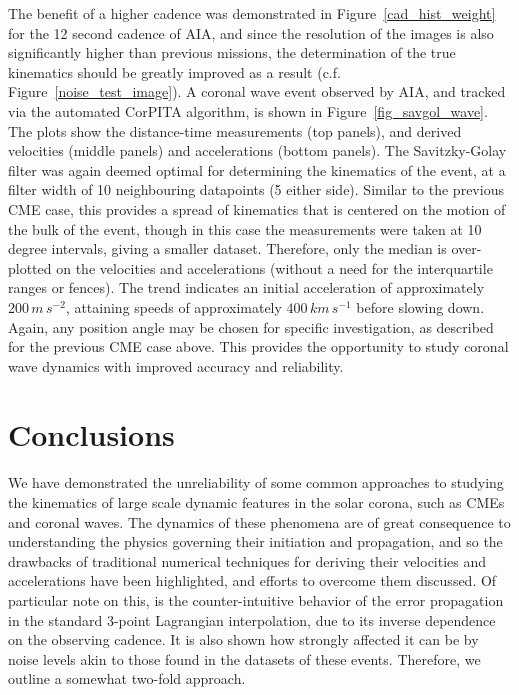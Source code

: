 \documentclass[structabstract]{aa}
\begin{document}
The benefit of a higher cadence was demonstrated in Figure~\ref{cad_hist_weight} for the 12 second cadence of AIA, and since the resolution of the images is also significantly higher than previous missions, the determination of the true kinematics should be greatly improved as a result (c.f. Figure~\ref{noise_test_image}). A coronal wave event observed by AIA, and tracked via the automated CorPITA algorithm, is shown in Figure~\ref{fig_savgol_wave}. The plots show the distance-time measurements (top panels), and derived velocities (middle panels) and accelerations (bottom panels). The Savitzky-Golay filter was again deemed optimal for determining the kinematics of the event, at a filter width of 10 neighbouring datapoints (5 either side). Similar to the previous CME case, this provides a spread of kinematics that is centered on the motion of the bulk of the event, though in this case the measurements were taken at 10 degree intervals, giving a smaller dataset. Therefore, only the median is over-plotted on the velocities and accelerations (without a need for the interquartile ranges or fences). The trend indicates an initial acceleration of approximately $200\,m\,s^{-2}$, attaining speeds of approximately $400\,km\,s^{-1}$ before slowing down. Again, any position angle may be chosen for specific investigation, as described for the previous CME case above. This provides the opportunity to study coronal wave dynamics with improved accuracy and reliability.


\section{Conclusions}
\label{sect:conclusions}

We have demonstrated the unreliability of some common approaches to studying the kinematics of large scale dynamic features in the solar corona, such as CMEs and coronal waves. The dynamics of these phenomena are of great consequence to understanding the physics governing their initiation and propagation, and so the drawbacks of traditional numerical techniques for deriving their velocities and accelerations have been highlighted, and efforts to overcome them discussed. Of particular note on this, is the counter-intuitive behavior of the error propagation in the standard 3-point Lagrangian interpolation, due to its inverse dependence on the observing cadence. It is also shown how strongly affected it can be by noise levels akin to those found in the datasets of these events. Therefore, we outline a somewhat two-fold approach.
\end{document}
